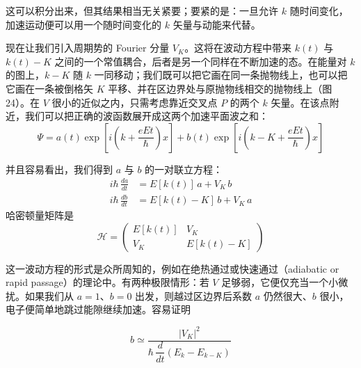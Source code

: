 这可以积分出来，但其结果相当无关紧要；要紧的是：一旦允许 $k$ 随时间变化，加速运动便可以用一个随时间变化的 $k$ 矢量与动能来代替。

现在让我们引入周期势的 Fourier 分量 $V_K$。这将在波动方程中带来 $k(t)$ 与 $k(t)-K$ 之间的一个常值耦合，后者是另一个同样在不断加速的态。在能量对 $k$ 的图上，$k-K$ 随 $k$ 一同移动；我们既可以把它画在同一条抛物线上，也可以把它画在一条被倒格矢 $K$ 平移、并在区边界处与原抛物线相交的抛物线上（图 24）。在 $V$ 很小的近似之内，只需考虑靠近交叉点 $P$ 的两个 $k$ 矢量。在该点附近，我们可以把正确的波函数展开成这两个加速平面波之和：
\begin{equation*}
\Psi = a(t)\exp\left[i\left(k+\frac{eEt}{\hbar}\right)x\right] + b(t)\exp\left[i\left(k-K+\frac{eEt}{\hbar}\right)x\right]
\end{equation*}



并且容易看出，我们得到 $a$ 与 $b$ 的一对联立方程：
\begin{align*}
i\hbar\,\frac{da}{dt} &= E[k(t)]\,a + V_K\,b \\
i\hbar\,\frac{db}{dt} &= E[k(t)-K]\,b + V_K\,a
\end{align*}
哈密顿量矩阵是
\begin{equation*}
\mathcal{H} = \begin{pmatrix} E[k(t)] & V_K \\ V_K & E[k(t)-K] \end{pmatrix}
\end{equation*}

这一波动方程的形式是众所周知的，例如在绝热通过或快速通过（adiabatic or rapid passage）的理论中。有两种极限情形：若 $V$ 足够弱，它便仅充当一个小微扰。如果我们从 $a=1$、$b=0$ 出发，则越过区边界后系数 $a$ 仍然很大、$b$ 很小，电子便简单地跳过能隙继续加速。容易证明


\begin{equation*}
b \simeq \frac{|V_K|^2}{\hbar\,\dfrac{d}{dt}\left(E_k - E_{k-K}\right)}
\end{equation*}


